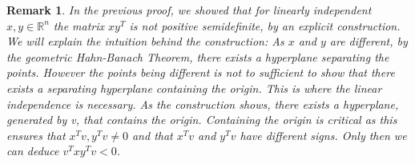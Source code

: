 \documentclass[12pt,a4paper]{article}
\theoremstyle{mythm}
\newtheorem*{rem}{Remark}
\newtheorem*{exa}{Example}
\begin{document}
\begin{rem}
In the previous proof, we showed that for linearly independent $ x,y \in \mathbb{R}  ^{ n }  $ the matrix $ x y ^T  $ is not positive semidefinite, by an explicit construction.
We will explain the intuition behind the construction:
As $ x $ and $ y $ are different, by the geometric Hahn-Banach Theorem, there exists a hyperplane separating the points.
However the points being different is not to sufficient to show that there exists a separating hyperplane containing the origin.
This is where the linear independence is necessary. As the construction shows, there exists a hyperplane, generated by v, that contains the origin. Containing the origin is
critical as this ensures that $ x^Tv , y^Tv \neq 0 $ and that $ x^Tv $ and $ y^Tv $ have different signs. Only then we can deduce $ v^T xy^T v < 0 $.
\end{rem} 

\end{document}
